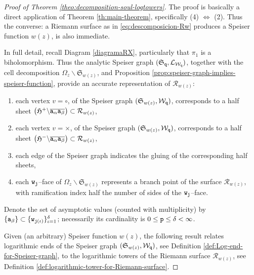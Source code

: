 \documentclass[final,3p,times]{elsarticle}
\newcommand{\R}{\ensuremath{{\mathcal R}}}
\theoremstyle{definition}
\begin{document}
\begin{proof}[Proof of Theorem \ref{theo:decomposition-soul-logtowers}]
The proof is basically a direct application of Theorem \ref{th:main-theorem}, 
specifically (4) $\Longleftrightarrow$ (2).
Thus the converse: a Riemann surface as in \eqref{eq:descomposicion-Rw} produces a
Speiser function $w(z)$, is also immediate.

In full detail,
recall Diagram \eqref{diagramaRX}, particularly that $\pi_1$ is a biholomorphism.
Thus the analytic Speiser graph $(\mathfrak{S}_{\tt q},\mathcal{L}_{\mathcal{W}_{\tt q}})$,
together with the cell decomposition $\Omega_z\backslash\mathfrak{S}_{w(z)}$, 
and Proposition \ref{prop:speiser-graph-implies-speiser-function}, 
provide an accurate representation of $\R_{w(z)}$:
\begin{enumerate}[label=\roman*),leftmargin=*]
\item  
each vertex $v=\circ$,  of 
the Speiser graph $(\mathfrak{S}_{w(z)},\mathcal{W}_{\tt q})$,
corresponds to a half sheet 
$\big( \mathfrak{H}^+ \backslash \overline{ {\tt a}_{\alpha} {\tt a}_{\beta} } \big) \subset \R_{w(z)}$,

\item
each vertex $v=\times$,  of 
the Speiser graph $(\mathfrak{S}_{w(z)},\mathcal{W}_{\tt q})$,
corresponds to a half sheet 
$\big( \mathfrak{H}^- \backslash \overline{ {\tt a}_{\alpha} {\tt a}_{\beta} } \big) \subset \R_{w(z)}$,

\item
each edge of the Speiser graph indicates the gluing of the corresponding half sheets,

\item
each ${\tt w}_{\tt j}$--face of
$\Omega_z\backslash\mathfrak{S}_{w(z)}$
represents a branch point of the surface $\R_{w(z)}$, with ramification
index half the number of sides of the ${\tt w}_{\tt j}$--face.
\end{enumerate}
 
\smallskip
Denote the set of asymptotic values (counted with multiplicity) by 
$\{{\tt a}_\beta \} \subset \{ {\tt w}_{{\tt j}(\iota)} \}_{\iota=1}^\delta$; 
necessarily its cardinality is $0 \leq {\tt p}\leq\delta < \infty$.

Given (an arbitrary) Speiser function $w(z)$, 
the following result relates logarithmic ends 
of the Speiser graph 
$(\mathfrak{S}_{w(z)},\mathcal{W}_{\tt q})$, see Definition \ref{def:Log-end-for-Speiser-graph},
to the
logarithmic towers of the Riemann surface $\R_{w(z)}$, 
see Definition \ref{def:logarithmic-tower-for-Riemann-surface}.



\end{proof}
\end{document}
